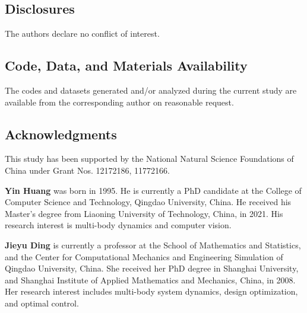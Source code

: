 \documentclass[12pt]{spieman}  %
\begin{document}
\begin{spacing}{2}
		\subsection*{Disclosures}
		The authors declare no conflict of interest.
		
		\subsection* {Code, Data, and Materials Availability}
		The codes and datasets generated and/or analyzed during the current study are available from the corresponding author on reasonable request.
		
		
		\subsection* {Acknowledgments}
		This study has been supported by the National Natural Science Foundations of China under Grant Nos. 12172186, 11772166.
		
		
		
		
		
		\vspace{2ex}\noindent\textbf{Yin Huang} was born in 1995. He is currently a PhD candidate at the College of Computer Science and Technology, Qingdao University, China. He received his Master's degree from Liaoning University of Technology, China, in 2021. His research interest is multi-body dynamics and computer vision.
		
		\vspace{2ex}\noindent\textbf{Jieyu Ding}  is currently a professor at the School of Mathematics and Statistics, and the Center for Computational Mechanics and Engineering Simulation of Qingdao University, China. She received her PhD degree in Shanghai University, and Shanghai Institute of Applied Mathematics and Mechanics, China, in 2008. Her research interest includes multi-body system dynamics, design optimization, and optimal control.
		
		\listoffigures
		\listoftables
		
	\end{spacing}
\end{document}
